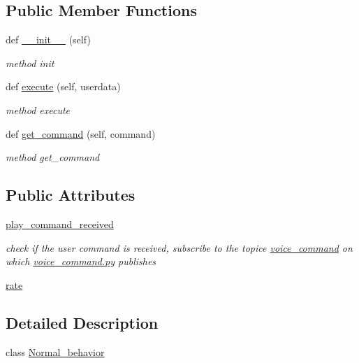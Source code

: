 \subsection*{Public Member Functions}
\begin{DoxyCompactItemize}
\item 
def \hyperlink{classbehavior__manager_1_1Normal__behavior_a7ab22900e936fc3921a269389b51e6ab}{\+\_\+\+\_\+init\+\_\+\+\_\+} (self)
\begin{DoxyCompactList}\small\item\em method init \end{DoxyCompactList}\item 
def \hyperlink{classbehavior__manager_1_1Normal__behavior_a15faab6a43a39510355baad4faaa808a}{execute} (self, userdata)
\begin{DoxyCompactList}\small\item\em method execute \end{DoxyCompactList}\item 
def \hyperlink{classbehavior__manager_1_1Normal__behavior_aaaac0d8e5b98600a4e8461f706cb7ef0}{get\+\_\+command} (self, command)
\begin{DoxyCompactList}\small\item\em method get\+\_\+command \end{DoxyCompactList}\end{DoxyCompactItemize}
\subsection*{Public Attributes}
\begin{DoxyCompactItemize}
\item 
\hyperlink{classbehavior__manager_1_1Normal__behavior_a023e0b91a5c02b8bce8cc771bba4ecfc}{play\+\_\+command\+\_\+received}
\begin{DoxyCompactList}\small\item\em check if the user command is received, subscribe to the topice \hyperlink{namespacevoice__command}{voice\+\_\+command} on which \hyperlink{voice__command_8py}{voice\+\_\+command.\+py} publishes \end{DoxyCompactList}\item 
\hyperlink{classbehavior__manager_1_1Normal__behavior_a8c0881c34370caec4f5298f0ebe35489}{rate}
\end{DoxyCompactItemize}


\subsection{Detailed Description}
class \hyperlink{classbehavior__manager_1_1Normal__behavior}{Normal\+\_\+behavior} 

